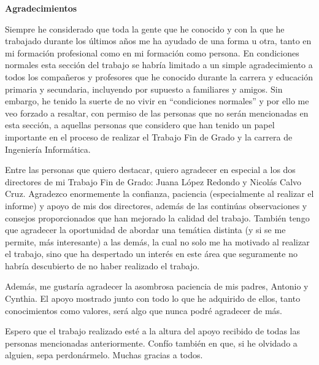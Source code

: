 {\huge \textbf{Agradecimientos}}

\vspace{1cm}

Siempre he considerado que toda la gente que he conocido y con la que he trabajado durante los últimos años me ha ayudado de una forma u otra, tanto en mi formación profesional como en mi formación como persona. En condiciones normales esta sección del trabajo se habría limitado a un simple agradecimiento a todos los compañeros y profesores que he conocido durante la carrera y educación primaria y secundaria, incluyendo por supuesto a familiares y amigos. Sin embargo, he tenido la suerte de no vivir en ``condiciones normales'' y por ello me veo forzado a resaltar, con permiso de las personas que no serán mencionadas en esta sección, a aquellas personas que considero que han tenido un papel importante en el proceso de realizar el Trabajo Fin de Grado y la carrera de Ingeniería Informática.

Entre las personas que quiero destacar, quiero agradecer en especial a los dos directores de mi Trabajo Fin de Grado: Juana López Redondo y Nicolás Calvo Cruz. Agradezco enormemente la confianza, paciencia (especialmente al realizar el informe) y apoyo de mis dos directores, además de las continúas observaciones y consejos proporcionados que han mejorado la calidad del trabajo. También tengo que agradecer la oportunidad de abordar una temática distinta (y si se me permite, más interesante) a las demás, la cual no solo me ha motivado al realizar el trabajo, sino que ha despertado un interés en este área que seguramente no habría descubierto de no haber realizado el trabajo.

Además, me gustaría agradecer la asombrosa paciencia de mis padres, Antonio y Cynthia. El apoyo mostrado junto con todo lo que he adquirido de ellos, tanto conocimientos como valores, será algo que nunca podré agradecer de más.

Espero que el trabajo realizado esté a la altura del apoyo recibido de todas las personas mencionadas anteriormente. Confío también en que, si he olvidado a alguien, sepa perdonármelo. Muchas gracias a todos.
